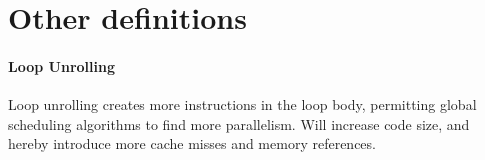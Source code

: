 \documentclass{article}
\begin{document}
\section{Other definitions} %
\label{sec:Other definitions}

\paragraph{Loop Unrolling} %
\label{par:Loop Unrolling}
Loop unrolling creates more instructions in the loop body, permitting global scheduling algorithms to find more parallelism. Will increase code size, and hereby introduce more cache misses and memory references.

\end{document}
